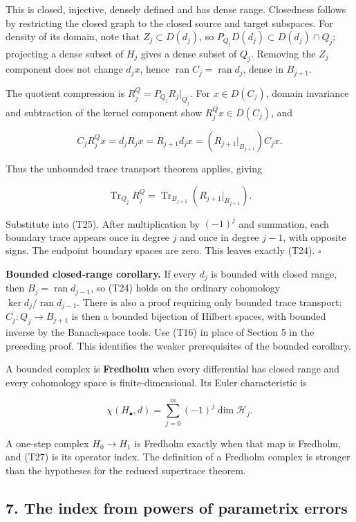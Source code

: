 \documentclass[
  11pt,
]{article}
\begin{document}
This is closed, injective, densely defined and has dense range.
Closedness follows by restricting the closed graph to the closed source
and target subspaces. For density of its domain, note that
\(Z_j\subset D(d_j)\), so \(P_{Q_j}D(d_j)\subset D(d_j)\cap Q_j\);
projecting a dense subset of \(H_j\) gives a dense subset of \(Q_j\).
Removing the \(Z_j\) component does not change \(d_jx\), hence
\(\operatorname{ran}C_j=\operatorname{ran}d_j\), dense in \(B_{j+1}\).

The quotient compression is \(R_j^Q=P_{Q_j}R_j|_{Q_j}\). For
\(x\in D(C_j)\), domain invariance and subtraction of the kernel
component show \(R_j^Qx\in D(C_j)\), and

\[
C_jR_j^Qx=d_jR_jx
=R_{j+1}d_jx=(R_{j+1}|_{B_{j+1}})C_jx.
\]

Thus the unbounded trace transport theorem applies, giving

\[
\operatorname{Tr}_{Q_j}R_j^Q
=\operatorname{Tr}_{B_{j+1}}(R_{j+1}|_{B_{j+1}}).            \tag{T26}
\]

Substitute into (T25). After multiplication by \((-1)^j\) and summation,
each boundary trace appears once in degree \(j\) and once in degree
\(j-1\), with opposite signs. The endpoint boundary spaces are zero.
This leaves exactly (T24). \(\square\)

\textbf{Bounded closed-range corollary.} If every \(d_j\) is bounded
with closed range, then \(B_j=\operatorname{ran}d_{j-1}\), so (T24)
holds on the ordinary cohomology \(\ker d_j/\operatorname{ran}d_{j-1}\).
There is also a proof requiring only bounded trace transport:
\(C_j:Q_j\to B_{j+1}\) is then a bounded bijection of Hilbert spaces,
with bounded inverse by the Banach-space tools. Use (T16) in place of
Section 5 in the preceding proof. This identifies the weaker
prerequisites of the bounded corollary.

A bounded complex is \textbf{Fredholm} when every differential has
closed range and every cohomology space is finite-dimensional. Its Euler
characteristic is

\[
\chi(H_\bullet,d)=\sum_{j=0}^m(-1)^j\dim\mathcal H_j.         \tag{T27}
\]

A one-step complex \(H_0\to H_1\) is Fredholm exactly when that map is
Fredholm, and (T27) is its operator index. The definition of a Fredholm
complex is stronger than the hypotheses for the reduced supertrace
theorem.

\subsection{7. The index from powers of parametrix
errors}\label{the-index-from-powers-of-parametrix-errors}
\end{document}
